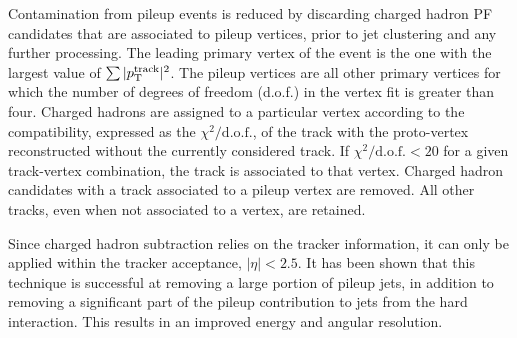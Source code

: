 Contamination from pileup events is reduced by discarding charged hadron PF candidates that are
associated to pileup vertices, prior to jet clustering and any further processing.   
The leading primary vertex of the event is the one with the largest value of $\sum
|p_{\mathrm{T}}^{\mathrm{track}}|^2$. The pileup vertices are all other primary vertices for which the number
of degrees of freedom (d.o.f.) in the vertex fit is greater than four. 
Charged hadrons are assigned to a particular vertex according to the compatibility, expressed as
the $\chi^2/\mathrm{d.o.f.}$, of the track with the proto-vertex reconstructed without the
currently considered track. If $\chi^2/\mathrm{d.o.f.}<20$ for a given track-vertex combination,
the track is associated to that vertex. 
Charged hadron candidates with a track associated to a pileup vertex are removed. All other tracks,
even when not associated to a vertex, are retained. 

Since charged hadron subtraction relies on the tracker information, it can only be applied within
the tracker acceptance, $|\eta| < 2.5$. It has been shown that this technique is successful at
removing a large portion of pileup jets, in addition to removing a significant part of the pileup
contribution to jets from the hard interaction. This results in an improved energy and angular
resolution. 


